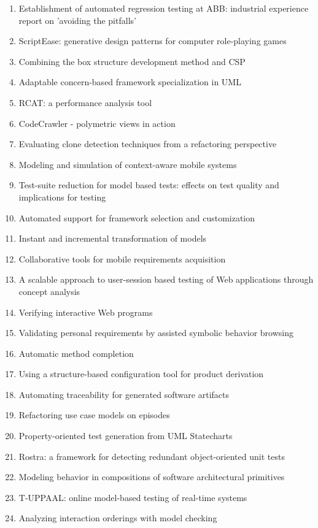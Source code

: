 \begin{enumerate}[itemsep=-1ex]
  \item Establishment of automated regression testing at ABB: industrial experience report on 'avoiding the pitfalls'
  \item ScriptEase: generative design patterns for computer role-playing games
  \item Combining the box structure development method and CSP
  \item Adaptable concern-based framework specialization in UML
  \item RCAT: a performance analysis tool
  \item CodeCrawler - polymetric views in action
  \item Evaluating clone detection techniques from a refactoring perspective
  \item Modeling and simulation of context-aware mobile systems
  \item Test-suite reduction for model based tests: effects on test quality and implications for testing
  \item Automated support for framework selection and customization
  \item Instant and incremental transformation of models
  \item Collaborative tools for mobile requirements acquisition
  \item A scalable approach to user-session based testing of Web applications through concept analysis
  \item Verifying interactive Web programs
  \item Validating personal requirements by assisted symbolic behavior browsing
  \item Automatic method completion
  \item Using a structure-based configuration tool for product derivation
  \item Automating traceability for generated software artifacts
  \item Refactoring use case models on episodes
  \item Property-oriented test generation from UML Statecharts
  \item Rostra: a framework for detecting redundant object-oriented unit tests
  \item Modeling behavior in compositions of software architectural primitives
  \item T-UPPAAL: online model-based testing of real-time systems
  \item Analyzing interaction orderings with model checking

\end{enumerate}
